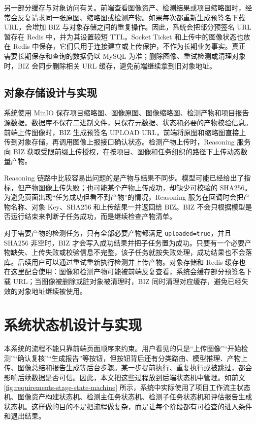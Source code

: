 另一部分缓存与对象访问有关。前端查看图像资产、检测结果或项目缩略图时，经常会反复请求同一张原图、缩略图或检测产物。如果每次都重新生成预签名下载 URL，会增加 BIZ 与对象存储之间的重复操作。因此，系统会把部分预签名 URL 暂存在 Redis 中，并为其设置较短 TTL。Socket Ticket 和上传中的图像状态也放在 Redis 中保存，它们只用于连接建立或上传保护，不作为长期业务事实。真正需要长期保存和查询的数据仍以 MySQL 为准；删除图像、重试检测或清理对象时，BIZ 会同步删除相关 URL 缓存，避免前端继续拿到旧对象地址。

\subsection{对象存储设计与实现}
\label{subsec:implementation-object-storage-design-and-implementation}

系统使用 MinIO 保存项目缩略图、图像原图、图像缩略图、检测产物和项目报告源数据。数据库不保存二进制文件，只保存元数据、状态和必要的产物校验信息。前端上传图像时，BIZ 生成预签名 UPLOAD URL，前端将原图和缩略图直接上传到对象存储，再调用图像上报接口确认状态。检测产物上传时，Reasoning 服务向 BIZ 获取受限前缀上传授权，在按项目、图像和任务组织的路径下上传动态数量产物。

Reasoning 链路中比较容易出问题的是产物与结果不同步。模型可能已经给出了指标，但产物图像上传失败；也可能某个产物上传成功，却缺少可校验的 SHA256。为避免页面出现“任务成功但看不到产物”的情况，Reasoning 服务在回调时会把产物名称、对象 Key、SHA256 和上传结果一并返回给 BIZ。BIZ 不会只根据模型是否运行结束来判断子任务成功，而是继续检查产物清单。

对于需要产物的检测任务，只有全部必要产物都满足 \texttt{uploaded=true}，并且 SHA256 非空时，BIZ 才会写入成功结果并把子任务置为成功。只要有一个必要产物缺失、上传失败或校验信息不完整，该子任务就按失败处理，成功结果也不会落库。后续用户可以通过重试重新执行检测并上传产物。对象存储和 Redis 缓存也在这里配合使用：图像和检测产物可能被前端反复查看，系统会缓存部分预签名下载 URL；当图像被删除或脏对象被清理时，BIZ 同时清理对应缓存，避免已经失效的对象地址继续被使用。

\section{系统状态机设计与实现}
\label{sec:implementation-system-state-machine-design-and-implementation}

本系统的流程不能只靠前端页面顺序来约束。用户看见的只是“上传图像”“开始检测”“确认复核”“生成报告”等按钮，但按钮背后还有分类路由、模型推理、产物上传、图像总结和报告生成等后台步骤。某一步提前执行、重复执行或被跳过，都会影响后续数据是否可信。因此，本文把这些过程放到后端状态机中管理。如前文\cref{fig:requirements-stage-state-machine} 所示，系统中实际使用了项目工作流主状态机、图像资产构建状态机、检测主任务状态机、检测子任务状态机和评估报告生成状态机。这样做的目的不是把流程做复杂，而是让每个阶段都有可检查的进入条件和退出结果。

